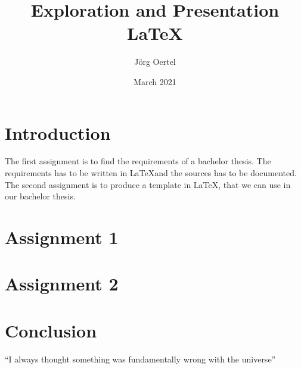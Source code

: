 \documentclass{article}
\title{Exploration and Presentation \LaTeX}
\author{Jörg Oertel}
\date{March 2021}
\begin{document}
\clearpage\maketitle
\thispagestyle{empty}

\tableofcontents

\clearpage

\section{Introduction}

The first assignment is to find the requirements of a bachelor thesis. The requirements has to be written in \LaTeX and the sources has to be documented.
\linebreak
The second assignment is to produce a template in \LaTeX, that we can use in our bachelor thesis.

\clearpage

\section{Assignment 1}


\clearpage


\clearpage

\section{Assignment 2}


\clearpage

\section{Conclusion}
``I always thought something was fundamentally wrong with the universe'' \citep{adams1995hitchhiker}


\clearpage



\listoftodos[Notes]
\end{document}
